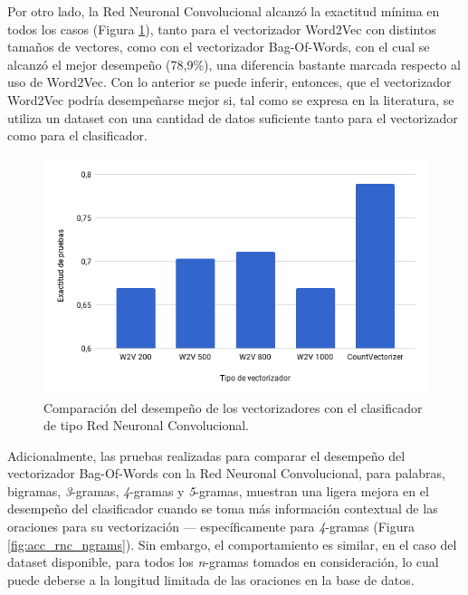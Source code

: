 \documentclass[conference]{IEEEtran}
\begin{document}
        Por otro lado, la Red Neuronal Convolucional alcanzó la exactitud mínima en todos los casos (Figura \ref{fig:acc_rnc}), tanto para el vectorizador Word2Vec con distintos tamaños de vectores, como con el vectorizador Bag-Of-Words, con el cual se alcanzó el mejor desempeño (78,9\%), una diferencia bastante marcada respecto al uso de Word2Vec. Con lo anterior se puede inferir, entonces, que el vectorizador Word2Vec podría desempeñarse mejor si, tal como se expresa en la literatura, se utiliza un dataset con una cantidad de datos suficiente tanto para el vectorizador como para el clasificador.
        
        \begin{figure}[htbp]
            \centerline{\includegraphics[width=\linewidth]{figuras/acc_rnc.png}}
            \captionsetup{justification=centering}
            \caption{Comparación del desempeño de los vectorizadores con el clasificador de tipo Red Neuronal Convolucional.}
            \label{fig:acc_rnc}
        \end{figure}
    
        Adicionalmente, las pruebas realizadas para comparar el desempeño del vectorizador Bag-Of-Words con la Red Neuronal Convolucional, para palabras, bigramas, \textit{3}-gramas, \textit{4}-gramas y \textit{5}-gramas, muestran una ligera mejora en el desempeño del clasificador cuando se toma más información contextual de las oraciones para su vectorización --- específicamente para \textit{4}-gramas (Figura \ref{fig:acc_rnc_ngrams}). Sin embargo, el comportamiento es similar, en el caso del dataset disponible, para todos los \textit{n}-gramas tomados en consideración, lo cual puede deberse a la longitud limitada de las oraciones en la base de datos.
        
\end{document}
